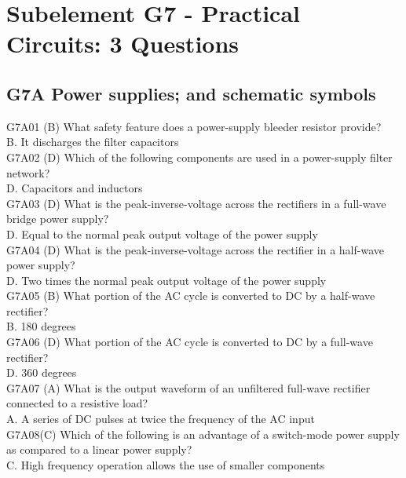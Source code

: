 \documentclass[12pt,letterpaper]{report}
\begin{document}
\chapter{Subelement G7 - Practical Circuits: 3 Questions}

\section{G7A Power supplies; and schematic symbols}

G7A01 (B) What safety feature does a power-supply bleeder resistor provide?\\
B. It discharges the filter capacitors\\

G7A02 (D) Which of the following components are used in a power-supply filter network?\\
D. Capacitors and inductors\\

G7A03 (D) What is the peak-inverse-voltage across the rectifiers in a full-wave bridge power supply?\\
D. Equal to the normal peak output voltage of the power supply\\

G7A04 (D) What is the peak-inverse-voltage across the rectifier in a half-wave power supply?\\
D. Two times the normal peak output voltage of the power supply\\

G7A05 (B) What portion of the AC cycle is converted to DC by a half-wave rectifier?\\
B. 180 degrees\\

G7A06 (D) What portion of the AC cycle is converted to DC by a full-wave rectifier?\\
D. 360 degrees\\

G7A07 (A) What is the output waveform of an unfiltered full-wave rectifier connected to a resistive load?\\
A. A series of DC pulses at twice the frequency of the AC input\\

G7A08(C) Which of the following is an advantage of a switch-mode power supply as compared to a linear power supply?\\
C. High frequency operation allows the use of smaller components\\
\end{document}

